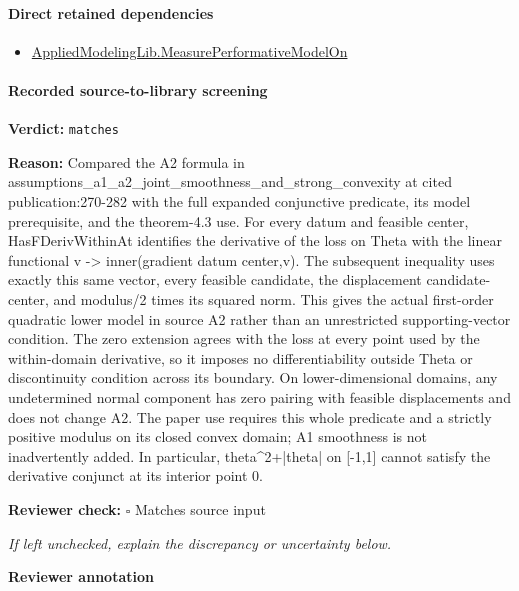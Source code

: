 \documentclass[10pt]{article}
\newcommand{\reviewerbox}{%
  \par\noindent\fbox{\parbox{0.96\linewidth}{\rule{0pt}{0.38in}}}\par
}
\newcommand{\reviewmatch}[1]{%
  \par\noindent\textbf{Reviewer check:} $\square$\; #1\par
  \noindent\emph{If left unchecked, explain the discrepancy or uncertainty below.}\par
}
\begin{document}
\paragraph{Direct retained dependencies}
\begin{itemize}\raggedright
\item \hyperlink{library-prerequisite-e14cc5e8b1e1460e}{Applied\allowbreak{}Modeling\allowbreak{}Lib.\allowbreak{}Measure\allowbreak{}Performative\allowbreak{}Model\allowbreak{}On}
\end{itemize}
\paragraph{Recorded source-to-library screening}
\textbf{Verdict:} \texttt{matches}
\\
{\raggedright
\textbf{Reason:} Compared the A2 formula in assumptions\_\allowbreak{}a1\_\allowbreak{}a2\_\allowbreak{}joint\_\allowbreak{}smoothness\_\allowbreak{}and\_\allowbreak{}strong\_\allowbreak{}convexity at cited publication:\allowbreak{}270-\allowbreak{}282 with the full expanded conjunctive predicate, its model prerequisite, and the theorem-\allowbreak{}4.\allowbreak{}3 use.\allowbreak{} For every datum and feasible center, HasFDerivWithinAt identifies the derivative of the loss on Theta with the linear functional v -\allowbreak{}> inner(gradient datum center,v).\allowbreak{} The subsequent inequality uses exactly this same vector, every feasible candidate, the displacement candidate-\allowbreak{}center, and modulus/\allowbreak{}2 times its squared norm.\allowbreak{} This gives the actual first-\allowbreak{}order quadratic lower model in source A2 rather than an unrestricted supporting-\allowbreak{}vector condition.\allowbreak{} The zero extension agrees with the loss at every point used by the within-\allowbreak{}domain derivative, so it imposes no differentiability outside Theta or discontinuity condition across its boundary.\allowbreak{} On lower-\allowbreak{}dimensional domains, any undetermined normal component has zero pairing with feasible displacements and does not change A2.\allowbreak{} The paper use requires this whole predicate and a strictly positive modulus on its closed convex domain;\allowbreak{} A1 smoothness is not inadvertently added.\allowbreak{} In particular, theta\textasciicircum{}2+|theta| on [-\allowbreak{}1,1] cannot satisfy the derivative conjunct at its interior point 0.\allowbreak{}
\par}
\reviewmatch{Matches source input}
\noindent\textbf{Reviewer annotation}\par
\reviewerbox
\clearpage
\hypertarget{library-prerequisite-0e1e192eee739a4b}{}
\end{document}
